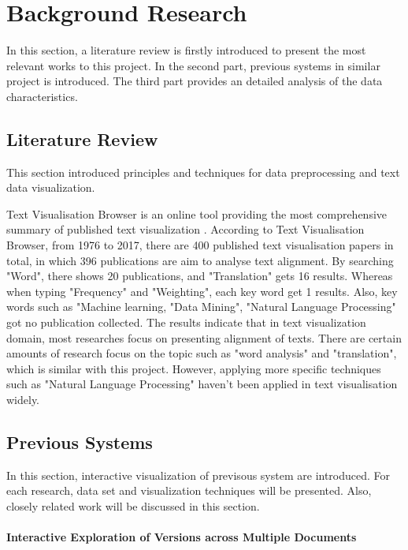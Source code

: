 \clearpage
\section{Background Research}

In this section, a literature review is firstly introduced to present the most relevant works to this project. In the second part, previous systems in similar project is introduced. The third part provides an detailed analysis of the data characteristics.

\subsection{Literature Review}
This section introduced principles and techniques for data preprocessing and text data visualization.

Text Visualisation Browser \cite{Kucher2014} is an online tool providing the most comprehensive summary of published text visualization \cite{Cao2016a}. According to Text Visualisation Browser, from 1976 to 2017, there are 400 published text visualisation papers in total, in which 396 publications are aim to analyse text alignment. By searching "Word", there shows 20 publications, and "Translation" gets 16 results. Whereas when typing "Frequency" and "Weighting", each key word get 1 results. Also, key words such as "Machine learning, "Data Mining", "Natural Language Processing" got no publication collected. The results indicate that in text visualization domain, most researches focus on presenting alignment of texts. There are certain amounts of research focus on the topic such as "word analysis" and "translation", which is similar with this project. However, applying more specific techniques such as "Natural Language Processing" haven't been applied in text visualisation widely.

\subsection{Previous Systems}

In this section, interactive visualization of previsous system are introduced. For each research, data set and visualization techniques will be presented. Also, closely related work will be discussed in this section. 

\paragraph{Interactive Exploration of Versions across Multiple Documents}

